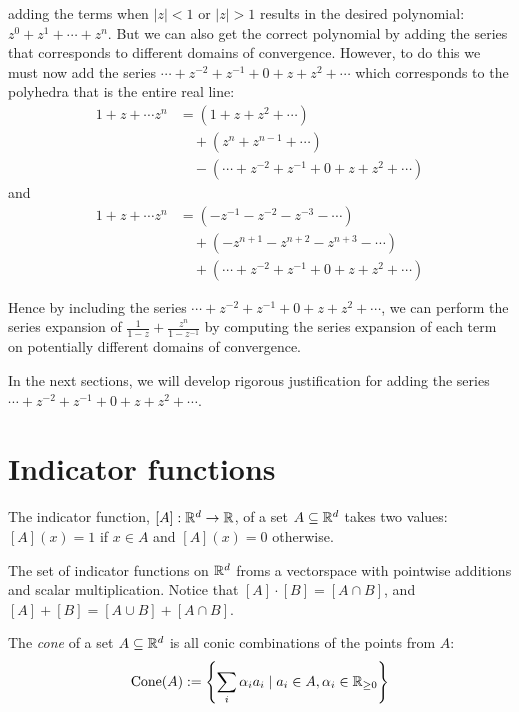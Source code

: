 adding the terms when $|z| <1$  or $|z| > 1$ results in the desired polynomial: $z^0 + z^1 + \cdots + z^n$. But we can also get the correct polynomial by adding the series that corresponds to different domains of convergence. However, to do this we must now add the series $\cdots + z^{-2} + z^{-1} + 0 + z + z^2 + \cdots$ which corresponds to the polyhedra that is the entire real line:
\begin{align*}
1 + z + \cdots z^n &= (1 + z + z^2 + \cdots)\\
& \quad  + (z^n + z^{n-1} + \cdots)  \\
& \quad - (\cdots + z^{-2} + z^{-1} + 0 + z + z^2 + \cdots)
\end{align*}
and
\begin{align*}
1 + z + \cdots z^n &= (-z^{-1} -z^{-2} - z^{-3} - \cdots)\\
& \quad  + (-z^{n+1} - z^{n+2} - z^{n+3} -\cdots)  \\
& \quad + (\cdots + z^{-2} + z^{-1} + 0 + z + z^2 + \cdots)
\end{align*}

Hence by including the series $\cdots + z^{-2} + z^{-1} + 0 + z + z^2 + \cdots$, we can perform the series expansion of $\frac{1}{1-z} + \frac{z^n}{1-z^{-1}}$ by computing the series expansion of each term on potentially different domains of convergence. 

In the next sections, we will develop rigorous justification for adding the series  $\cdots + z^{-2} + z^{-1} + 0 + z + z^2 + \cdots$.
 
\section{Indicator functions}

\begin{definition} 
The indicator function, $[A]: {\mathbb R}^d \rightarrow {\mathbb R}$, of a set $A \subseteq {\mathbb R}^d$ takes two values: $[A](x) =1$ if $x \in A$ and $[A](x)=0$ otherwise. 
\end{definition} 

The set of indicator functions on ${\mathbb R}^d$ froms a vectorspace with pointwise additions and scalar multiplication. Notice that $[A]\cdot [B] = [A \cap B]$, and $[A]+[B] = [A \cup B] + [A \cap B]$. 

\begin{definition} The \emph{cone} of a set $A \subseteq {\mathbb R}^d$ is all conic combinations of the points from $A$:
\[\operatorname{Cone}(A) := \left\{ \sum_i \alpha_i a_i \mid a_i \in A, \alpha_i \in {\mathbb R}_{\geq 0} \right\} \]
\end{definition} 

